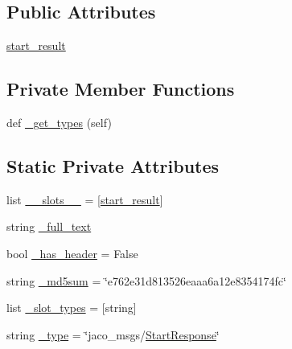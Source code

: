 \subsection*{Public Attributes}
\begin{DoxyCompactItemize}
\item 
\hyperlink{classjaco__msgs_1_1srv_1_1__Start_1_1StartResponse_a62f332f9a7e3128e9b27343abd5e715e}{start\+\_\+result}
\end{DoxyCompactItemize}
\subsection*{Private Member Functions}
\begin{DoxyCompactItemize}
\item 
def \hyperlink{classjaco__msgs_1_1srv_1_1__Start_1_1StartResponse_a8d6de41563971f0d8ddb93d076e8b623}{\+\_\+get\+\_\+types} (self)
\end{DoxyCompactItemize}
\subsection*{Static Private Attributes}
\begin{DoxyCompactItemize}
\item 
list \hyperlink{classjaco__msgs_1_1srv_1_1__Start_1_1StartResponse_ad4aa03fbe98c7b367716e72d5df523b7}{\+\_\+\+\_\+slots\+\_\+\+\_\+} = \mbox{[}\textquotesingle{}\hyperlink{classjaco__msgs_1_1srv_1_1__Start_1_1StartResponse_a62f332f9a7e3128e9b27343abd5e715e}{start\+\_\+result}\textquotesingle{}\mbox{]}
\item 
string \hyperlink{classjaco__msgs_1_1srv_1_1__Start_1_1StartResponse_a8469c4a6e7d49f298356e2dc5268e62d}{\+\_\+full\+\_\+text}
\item 
bool \hyperlink{classjaco__msgs_1_1srv_1_1__Start_1_1StartResponse_ab7f7782ea21c3c3e2d5ddc6e911b7b92}{\+\_\+has\+\_\+header} = False
\item 
string \hyperlink{classjaco__msgs_1_1srv_1_1__Start_1_1StartResponse_a85e71a0124f72af28952a490a870efd3}{\+\_\+md5sum} = \char`\"{}e762e31d813526eaaa6a12e8354174fc\char`\"{}
\item 
list \hyperlink{classjaco__msgs_1_1srv_1_1__Start_1_1StartResponse_a6d420b6cb37998640f06d63d1939195d}{\+\_\+slot\+\_\+types} = \mbox{[}\textquotesingle{}string\textquotesingle{}\mbox{]}
\item 
string \hyperlink{classjaco__msgs_1_1srv_1_1__Start_1_1StartResponse_a9e46790a7d93531a6a7d29513153d8cb}{\+\_\+type} = \char`\"{}jaco\+\_\+msgs/\hyperlink{classjaco__msgs_1_1srv_1_1__Start_1_1StartResponse}{Start\+Response}\char`\"{}
\end{DoxyCompactItemize}


